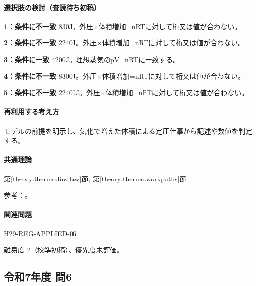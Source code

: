 \paragraph{選択肢の検討（査読待ち初稿）}\mbox{}\par

\noindent\textbf{1：条件に不一致} 830J。外圧×体積増加=nRTに対して桁又は値が合わない。\par

\noindent\textbf{2：条件に不一致} 2240J。外圧×体積増加=nRTに対して桁又は値が合わない。\par

\noindent\textbf{3：条件に一致} 4200J。理想蒸気のpV=\allowbreak{}nRTに一致する。\par

\noindent\textbf{4：条件に不一致} 8300J。外圧×体積増加=nRTに対して桁又は値が合わない。\par

\noindent\textbf{5：条件に不一致} 22400J。外圧×体積増加=nRTに対して桁又は値が合わない。\par

\paragraph{再利用する考え方} モデルの前提を明示し、気化で増えた体積による定圧仕事から記述や数値を判定する。

\paragraph{共通理論} \hyperref[theory:thermo:firstlaw]{第\ref*{theory:thermo:firstlaw}節}, \hyperref[theory:thermo:workpaths]{第\ref*{theory:thermo:workpaths}節}

\par 参考：\cite{mit_thermo_firstlaw2008}。

\paragraph{関連問題} \hyperref[q:h29-reg-applied-06]{H29-REG-APPLIED-06}

\par 難易度 2（校準初稿）、優先度未評価。

\subsection{令和7年度 問6}
\label{q:r07-reg-applied-06}

